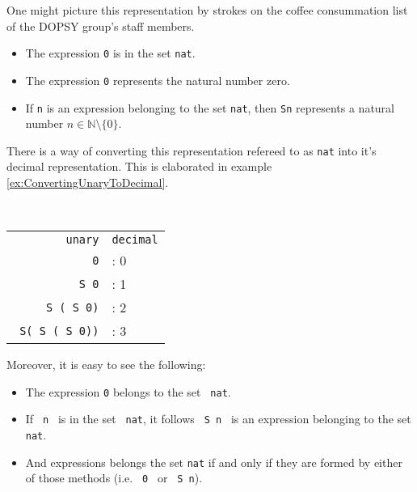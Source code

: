 	 One might picture this representation by strokes on the coffee consummation list of the DOPSY group's staff members.  
	  \begin{itemize}
	  \item The expression \lstinline!0! is in the set \lstinline!nat!.
	  \item The expression \lstinline!0! represents the natural number zero. 
	  \item If \lstinline!n! is an expression belonging to the set \lstinline!nat!, then \lstinline!Sn! represents a natural number $n\in\mathbb{N}\setminus\{ 0\}$.  
	  \end{itemize}
	  There is a way of converting this representation refereed to as \lstinline!nat! into it's decimal representation. 
	  This is elaborated in example \ref{ex:ConvertingUnaryToDecimal}.
	  \begin{example} \label{ex:ConvertingUnaryToDecimal} ~\\%
	  \begin{center}  
		  \begin{tabular} {r l}
		  
			  \texttt{unary}				& \texttt{decimal}	\\
			  \texttt{\lstinline!0!} 		&: 0 				\\
			  \texttt{\lstinline! S 0!}  	&: 1				\\
			  \texttt{\lstinline! S ( S 0)!}	&: 2			\\
			  \texttt{\lstinline! S( S ( S 0))!}	&: 3		\\
			    
		  \end{tabular}
		  \end{center}
	  \end{example}
	  Moreover, it is easy to see the following: 
	  \begin{itemize}
	  \item The expression \lstinline!0! belongs to the set \lstinline! nat!.
	  \item If \lstinline! n ! is in the set \lstinline! nat!, it follows \lstinline! S n ! is an expression belonging to the set \lstinline! nat!.
	  \item And expressions belongs the set \lstinline!nat! if and only if they are  formed by either of those methods (i.e. \lstinline! 0 ! or  \lstinline! S n!). 
	  \end{itemize}  
